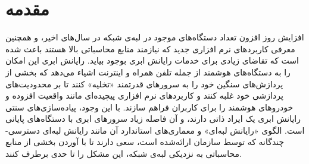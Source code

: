\chapter{مقدمه} 
افزایش روز افزون تعداد دستگاه‌های موجود در لبه‌ی شبکه در سال‌های اخیر، و همچنین معرفی کاربردهای نرم افزاری جدید که نیازمند منابع محاسباتی بالا هستند باعث شده است که تقاضای زیادی برای خدمات رایانش ابری بوجود بیاید. رایانش ابری این امکان را به دستگاه‌های هوشمند از جمله تلفن همراه و اینترنت اشیاء می‌دهد که بخشی از پردازش‌های سنگین خود را به سرورهای قدرتمند «تخلیه» کنند تا بر محدودیت‌های پردازشی خود غلبه کنند و کاربردهای نرم افزاری پیچیده‌ای مانند واقعیت افزوده و خودروهای هوشمند را برای کاربران فراهم سازند. با این وجود، پیاده‌سازی‌های سنتی رایانش ابری یک ایراد ذاتی دارند، و آن فاصله زیاد سرورهای ابری با دستگاه‌های پایانی است. الگوی «رایانش لبه‌ای» و معماری‌های استاندارد آن مانند رایانش لبه‌ای دسترسی-چندگانه که توسط سازمان  ارائه‌شده است، سعی دارند تا با آوردن بخشی از منابع محاسباتی به نزدیکی لبه‌ی شبکه، این مشکل را تا حدی برطرف کنند. \\ 

